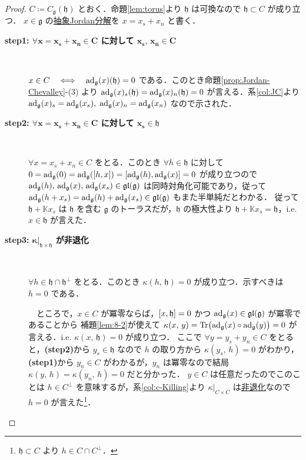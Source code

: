 \documentclass[rep_main]{subfiles}
\begin{document}
\begin{proof}
	$C \coloneqq  C_{\mathfrak{g}}(\mathfrak{h})$ とおく．命題\ref{lem:torus}より $\mathfrak{h}$ は可換なので $\mathfrak{h} \subset C$ が成り立つ．
	$x \in \mathfrak{g}$ の\hyperref[def:abstruct-JC]{抽象Jordan分解}を $x = x_s + x_n$ と書く．
	\begin{description}
		\item[\textbf{step1: $\bm{\forall x = x_s + x_n \in C}$ に対して $\bm{x_s},\, \bm{x_n \in C}$}]　
		
		$x \in C \quad \Longleftrightarrow \quad \operatorname{ad}_{\mathfrak{g}}(x)(\mathfrak{h}) = 0$ である．このとき命題\ref{prop:Jordan-Chevalley}-(3) より $\operatorname{ad}_{\mathfrak{g}}(x)_s(\mathfrak{h}) = \operatorname{ad}_{\mathfrak{g}}(x)_n(\mathfrak{h}) = 0$ が言える．系\ref{col:JC}より $\operatorname{ad}_{\mathfrak{g}}(x)_s = \operatorname{ad}_{\mathfrak{g}}(x_s),\; \operatorname{ad}_{\mathfrak{g}}(x)_n = \operatorname{ad}_{\mathfrak{g}}(x_n)$ なので示された．
		
		\item[\textbf{step2: $\bm{\forall x = x_s + x_n \in C}$ に対して $\bm{x_s \in \mathfrak{h}}$}]　
		
		$\forall x = x_s + x_n \in C$ をとる．このとき $\forall h \in \mathfrak{h}$ に対して $0 = \ad_{\mathfrak{g}}(0) = \ad_{\mathfrak{g}}(\comm{h}{x}) = \comm{\ad_{\mathfrak{g}}(h)}{\ad_{\mathfrak{g}}(x)} = 0$ が成り立つので $\operatorname{ad}_{\mathfrak{g}}(h),\, \operatorname{ad}_{\mathfrak{g}}(x),\,  \operatorname{ad}_{\mathfrak{g}}(x_s) \in \mathfrak{gl}(\mathfrak{g})$ は同時対角化可能であり，従って $\operatorname{ad}_{\mathfrak{g}}(h+x_s) = \operatorname{ad}_{\mathfrak{g}}(h) + \operatorname{ad}_{\mathfrak{g}}(x_s) \in \mathfrak{gl}(\mathfrak{g})$ もまた半単純だとわかる．
		従って $\mathfrak{h} + \mathbb{K}x_s$ は $\mathfrak{h}$ を含む $\mathfrak{g}$ のトーラスだが，$\mathfrak{h}$ の極大性より $\mathfrak{h} + \mathbb{K} x_s = \mathfrak{h}$，i.e. $x \in \mathfrak{h}$ が言えた．

		\item[\textbf{step3: $\bm{\kappa}|_{\bm{\mathfrak{h} \times \mathfrak{h}}}$ が非退化}]　
		
		$\forall h \in \mathfrak{h} \cap \mathfrak{h}^\perp$ をとる．このとき $\kappa(h,\, \mathfrak{h}) = 0$ が成り立つ．示すべきは $h = 0$ である．

		　ところで，$x \in C$ が冪零ならば，$\comm{x}{\mathfrak{h}} = 0$ かつ $\operatorname{ad}_{\mathfrak{g}}(x) \in \mathfrak{gl}(\mathfrak{g})$ が冪零であることから
		補題\ref{lem:8-2}が使えて $\kappa(x,\, y) = \Tr \bigl( \operatorname{ad}_{\mathfrak{g}}(x) \circ \operatorname{ad}_{\mathfrak{g}}(y) \bigr) = 0$ が言える．i.e. $\kappa(x,\, \mathfrak{h}) = 0$ が成り立つ．
		ここで $\forall y = y_s + y_n \in C$ をとると，\textsf{\textbf{(step2)}}から $y_s \in \mathfrak{h}$ なので $h$ の取り方から $\kappa(y_s,\, h) = 0$ がわかり，\textsf{\textbf{(step1)}}から $y_n \in C$ がわかるが，$y_n$ は冪零なので結局 $\kappa(y,\, h) = \kappa(y_n,\, h) = 0$ だと分かった．
		$y \in C$ は任意だったのでこのことは $h \in C^\perp$ を意味するが，系\ref{col:c-Killing}より $\kappa|_{C \times C}$ は\hyperref[def:radical-bilinear]{非退化}なので $h = 0$ が言えた\footnote{$\mathfrak{h} \subset C$ より $h \in C \cap C^\perp$．}．
		

\end{description}
\end{proof}
\end{document}
